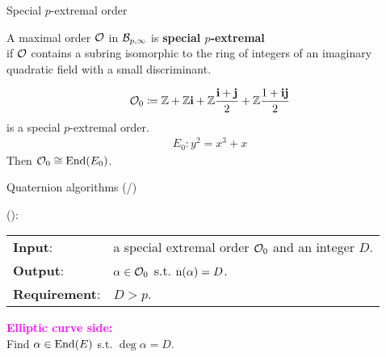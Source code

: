 \begin{frame}{Special $p$-extremal order}
    \begin{definition}[Informal]
        A maximal order $\mathcal{O}$ in $\mathcal{B}_{p,\infty}$ is \textbf{special $p$-extremal}\\
        if $\mathcal{O}$ contains a subring isomorphic to
        the ring of integers of an imaginary quadratic field with a small discriminant.
    \end{definition}

    \begin{align*}
        \mathcal{O}_0 \coloneqq \mathbb{Z} + \mathbb{Z}\mathbf{i} + \mathbb{Z}\frac{\mathbf{i} + \mathbf{j}}{2} + \mathbb{Z}\frac{1 + \mathbf{i}\mathbf{j}}{2}
    \end{align*}
    is a special $p$-extremal order.
    \begin{align*}
        E_0 : y^2 = x^3 + x
    \end{align*}
    Then $\mathcal{O}_0 \cong \mathrm{End}(E_0)$.
\end{frame}

\newcommand*{\algquatotal}{\total{cnt_alg_quat}}
\begin{frame}{Quaternion algorithms (/\algquatotal{})}

    {\large
    }
    (\cite{KLPT}):\\[5pt]
    \begin{tabular}{l l}
        \textbf{Input}: & a special extremal order $\mathcal{O}_0$ and an integer $D$.\\[3pt]
        \textbf{Output}: & $\alpha \in \mathcal{O}_0$ s.t. $\mathrm{n}(\alpha) = D$.\\[3pt]
        \textbf{Requirement}: & $D > p$.
    \end{tabular}

    \vspace{15pt}
    \textcolor{magenta}{\textbf{Elliptic curve side:}}\\[5pt]
    \quad Find $\alpha \in \mathrm{End}(E)$ s.t. $\deg\alpha = D$.

\end{frame}

